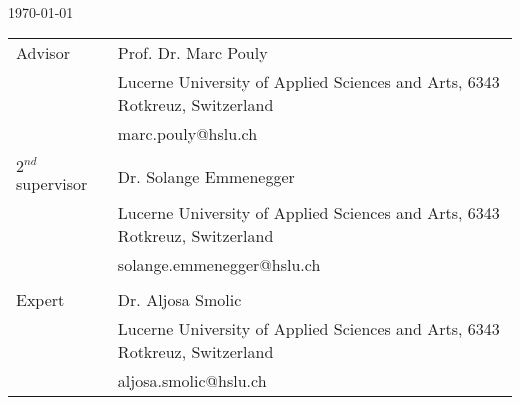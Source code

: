 \begin{titlepage}
	\begin{center}
        \vspace*{3cm} 
		\huge{\textbf{\thesisname}} \\
		\vspace{6em}
        \large{\titlename} \\
        \LARGE{\kindofthesis} \\
        \vspace{2em}
        \large {\presented} \\
		\LARGE{\authorname} \\
		\vspace{2em}
        \large{\schoolname} \\
        \vspace{8em}
        \large{\today} \\
        \normalsize

        \begin{table}[b]
            \begin{tabular}{l l}
                Advisor & Prof. Dr. Marc Pouly  \\
                & Lucerne University of Applied Sciences and Arts, 6343 Rotkreuz, Switzerland \\
                & marc.pouly@hslu.ch \\
                 & \\
                $2^{nd}$ supervisor & Dr. Solange Emmenegger \\
                & Lucerne University of Applied Sciences and Arts, 6343 Rotkreuz, Switzerland \\
                & solange.emmenegger@hslu.ch \\
                 & \\
                Expert & Dr. Aljosa Smolic \\
                & Lucerne University of Applied Sciences and Arts, 6343 Rotkreuz, Switzerland \\
                & aljosa.smolic@hslu.ch \\
            \end{tabular}
            \label{tab:supervisor_table}
        \end{table}


	\end{center}
\end{titlepage}
\clearpage